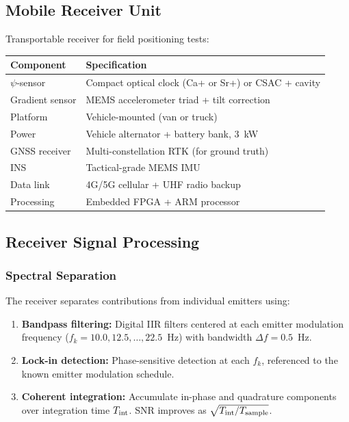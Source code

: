 \documentclass[11pt,a4paper]{article}
\begin{document}
\subsection{Mobile Receiver Unit}

Transportable receiver for field positioning tests:

\begin{longtable}{p{5cm}p{8cm}}
\toprule
\textbf{Component} & \textbf{Specification} \\
\midrule
\endfirsthead
$\psi$-sensor & Compact optical clock (Ca+ or Sr+) or CSAC + cavity \\
Gradient sensor & MEMS accelerometer triad + tilt correction \\
Platform & Vehicle-mounted (van or truck) \\
Power & Vehicle alternator + battery bank, 3~kW \\
GNSS receiver & Multi-constellation RTK (for ground truth) \\
INS & Tactical-grade MEMS IMU \\
Data link & 4G/5G cellular + UHF radio backup \\
Processing & Embedded FPGA + ARM processor \\
\bottomrule
\end{longtable}

\subsection{Receiver Signal Processing}

\subsubsection{Spectral Separation}

The receiver separates contributions from individual emitters using:
\begin{enumerate}
\item \textbf{Bandpass filtering:} Digital IIR filters centered at each
  emitter modulation frequency ($f_k = 10.0, 12.5, \ldots, 22.5$~Hz)
  with bandwidth $\Delta f = 0.5$~Hz.
\item \textbf{Lock-in detection:} Phase-sensitive detection at each $f_k$,
  referenced to the known emitter modulation schedule.
\item \textbf{Coherent integration:} Accumulate in-phase and quadrature
  components over integration time $T_{\rm int}$. SNR improves as
  $\sqrt{T_{\rm int}/T_{\rm sample}}$.
\end{enumerate}
\end{document}
